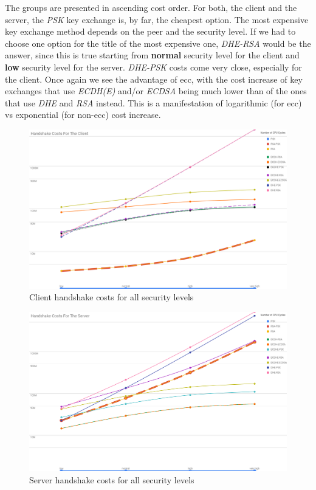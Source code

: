 The groups are presented in ascending cost order. For both, the client and the server, the \textit{PSK} key exchange is, by far,
the cheapest option. The most expensive key exchange method depends on the peer and the security level. If we had to choose one
option for the title of the most expensive one, \textit{DHE-RSA} would be the answer, since this is true starting from
\textbf{normal} security level for the client and \textbf{low} security level for the server. \textit{DHE-PSK} costs come very close, 
especially for the client. Once again we see the advantage of \gls{ecc}, with the cost increase of
key exchanges that use \textit{ECDH(E)} and/or \textit{ECDSA} being much lower than of the ones that use \textit{DHE} and \textit{RSA}
instead. This is a manifestation of logarithmic (for \gls{ecc}) vs exponential (for non-\gls{ecc}) cost increase.

\begin{figure}
  \centering
  \includegraphics[width=1.0\textwidth]{img/client_hs_costs_all_sls.png}
  \centering \caption{\label{fig:client-hs-cost-all-sls} Client handshake costs for all security levels}
\end{figure}

\begin{figure}
  \centering
  \includegraphics[width=1.0\textwidth]{img/server_hs_costs_all_sls.png}
  \centering \caption{\label{fig:server-hs-cost-all-sls} Server handshake costs for all security levels}
\end{figure}

